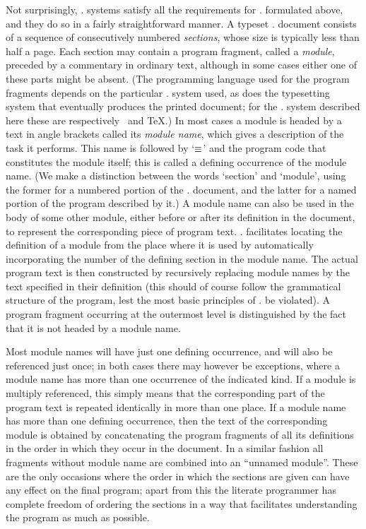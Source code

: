 Not surprisingly, \WEB. systems satisfy all the requirements for \lp.
formulated above, and they do so in a fairly straightforward manner.  A
typeset \WEB. document consists of a sequence of consecutively numbered {\sl
sections}, whose size is typically less than half a page. Each section may
contain a program fragment, called a {\sl module}, preceded by a commentary
in ordinary text, although in some cases either one of these parts might be
absent. (The programming language used for the program fragments depends on
the particular \WEB. system used, as does the typesetting system that
eventually produces the printed document; for the \CWEB. system described
here these are respectively \Cee\ and \TeX.) In most cases a module is
headed by a text in angle brackets called its {\sl module name}, which gives
a description of the task it performs. This name is followed by `$\equiv$' and
the program code that constitutes the module itself; this is called a
defining occurrence of the module name. (We make a distinction between the
words `section' and `module', using the former for a numbered portion of the
\WEB. document, and the latter for a named portion of the program described
by it.) A module name can also be used in the body of some other module,
either before or after its definition in the document, to represent the
corresponding piece of program text. \WEB. facilitates locating the
definition of a module from the place where it is used by automatically
incorporating the number of the defining section in the module name. The
actual program text is then constructed by recursively replacing module
names by the text specified in their definition (this should of course
follow the grammatical structure of the program, lest the most basic
principles of \lp. be violated). A program fragment occurring at the
outermost level is distinguished by the fact that it is not headed by a
module name.

Most module names will have just one defining occurrence, and will also be
referenced just once; in both cases there may however be exceptions, where a
module name has more than one occurrence of the indicated kind. If a module
is multiply referenced, this simply means that the corresponding part of the
program text is repeated identically in more than one place. If a module
name has more than one defining occurrence, then the text of the
corresponding module is obtained by concatenating the program fragments of
all its definitions in the order in which they occur in the document. In a
similar fashion all fragments without module name are combined into an
``unnamed module''. These are the only occasions where the order in which the
sections are given can have any effect on the final program; apart from this
the literate programmer has complete freedom of ordering the sections in a
way that facilitates understanding the program as much as possible.

